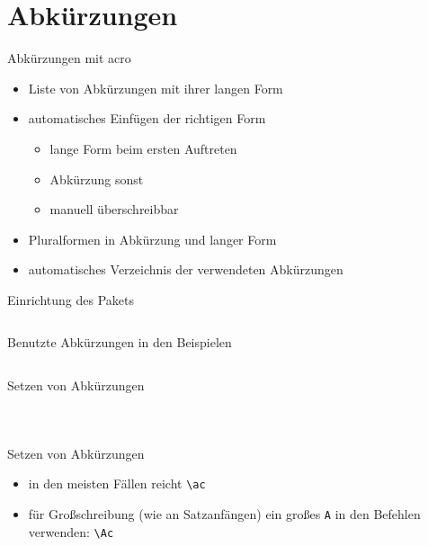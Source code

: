 \documentclass[presentation,aspectratio=169]{beamer}
\begin{document}
\section{Abkürzungen}

\begin{frame}{Abkürzungen mit acro}
  \begin{itemize}
    \item Liste von Abkürzungen mit ihrer langen Form
    \item automatisches Einfügen der richtigen Form
      \begin{itemize}
        \item lange Form beim ersten Auftreten
        \item Abkürzung sonst
        \item manuell überschreibbar
      \end{itemize}
    \item Pluralformen in Abkürzung und langer Form
    \item automatisches Verzeichnis der verwendeten Abkürzungen
  \end{itemize}
\end{frame}

\begin{frame}[fragile]{Einrichtung des Pakets}
  \inputminted{latex}{codebeispiele/acro-setup.tex}
\end{frame}

\begin{frame}[fragile]{Benutzte Abkürzungen in den Beispielen}
  \inputminted{latex}{codebeispiele/acro-used-acronyms.tex}
\end{frame}

\begin{frame}[fragile]{Setzen von Abkürzungen}
  \begin{columns}
    \begin{column}{.49\textwidth}
      
    \end{column}
    \begin{column}{.5\textwidth}
      \inputminted{latex}{codebeispiele/acro-usage.tex}
    \end{column}
  \end{columns}
\end{frame}

\begin{frame}[fragile]{Setzen von Abkürzungen}
  \begin{itemize}
    \item in den meisten Fällen reicht \verb|\ac|
    \item für Großschreibung (wie an Satzanfängen) ein großes \verb|A| in den Befehlen verwenden: \verb|\Ac|
  \end{itemize}
\end{frame}
\end{document}
